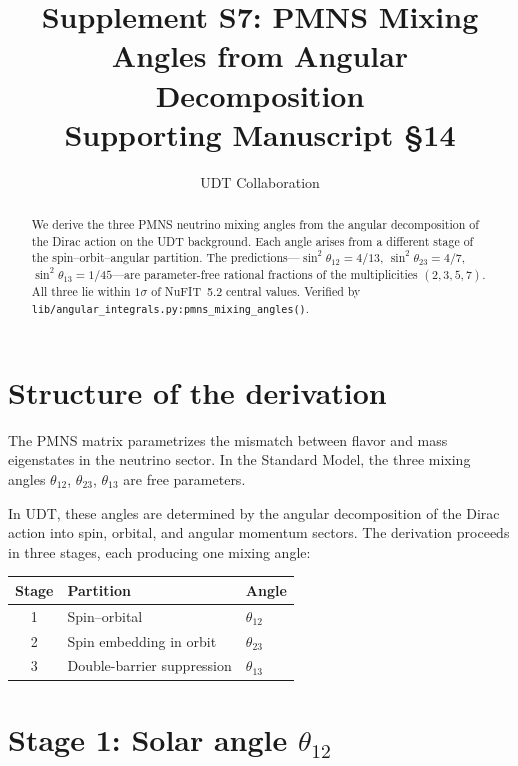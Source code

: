 \documentclass[11pt,letterpaper]{article}
\title{Supplement S7: PMNS Mixing Angles from Angular Decomposition \\
\large Supporting Manuscript \S14}
\author{UDT Collaboration}
\date{}
\numberwithin{equation}{section}
\begin{document}
\maketitle

\begin{abstract}
We derive the three PMNS neutrino mixing angles from the angular
decomposition of the Dirac action on the UDT background. Each angle
arises from a different stage of the spin--orbit--angular partition.
The predictions---$\sin^2\theta_{12} = 4/13$,
$\sin^2\theta_{23} = 4/7$, $\sin^2\theta_{13} = 1/45$---are
parameter-free rational fractions of the multiplicities $(2,3,5,7)$.
All three lie within $1\sigma$ of NuFIT~5.2 central values.
Verified by \texttt{lib/angular\_integrals.py:pmns\_mixing\_angles()}.
\end{abstract}

\tableofcontents

\section{Structure of the derivation}
\label{sec:structure}

The PMNS matrix parametrizes the mismatch between flavor and mass eigenstates
in the neutrino sector. In the Standard Model, the three mixing angles
$\theta_{12}$, $\theta_{23}$, $\theta_{13}$ are free parameters.

In UDT, these angles are determined by the angular decomposition of the
Dirac action into spin, orbital, and angular momentum sectors. The
derivation proceeds in three stages, each producing one mixing angle:

\begin{center}
\begin{tabular}{cll}
\toprule
Stage & Partition & Angle \\
\midrule
1 & Spin--orbital & $\theta_{12}$ \\
2 & Spin embedding in orbit & $\theta_{23}$ \\
3 & Double-barrier suppression & $\theta_{13}$ \\
\bottomrule
\end{tabular}
\end{center}

\section{Stage 1: Solar angle $\theta_{12}$}
\label{sec:theta12}
\end{document}

